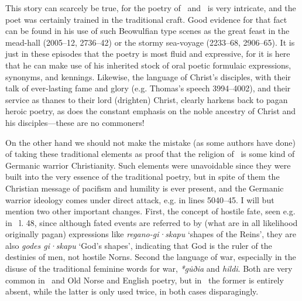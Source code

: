 This story can scarcely be true, for the poetry of \Heliand\ and \SaxonGenesis\ is very intricate, and the poet was certainly trained in the traditional craft.  Good evidence for that fact can be found in his use of such Beowulfian type scenes as the great feast in the mead-hall (2005–12, 2736–42) or the stormy sea-voyage (2233–68, 2906–65).  It is just in these episodes that the poetry is most fluid and expressive, for it is here that he can make use of his inherited stock of oral poetic formulaic expressions, synonyms, and kennings.  Likewise, the language of Christ’s disciples, with their talk of ever-lasting fame and glory (e.g. Thomas’s speech 3994–4002), and their service as thanes to their lord (drighten) Christ, clearly harkens back to pagan heroic poetry, as does the constant emphasis on the noble ancestry of Christ and his disciples—these are no commoners!

On the other hand we should not make the mistake (as some authors have done) of taking these traditional elements as proof that the religion of \Heliand\ is some kind of Germanic warrior Christianity.  Such elements were unavoidable since they were built into the very essence of the traditional poetry, but in spite of them the Christian message of pacifism and humility is ever present, and the Germanic warrior ideology comes under direct attack, e.g. in lines 5040–45.  I will but mention two other important changes.  First, the concept of hostile fate, seen e.g. in \Hildebrandslied\ l. 48, since although fated events are referred to by (what are in all likelihood originally pagan) expressions like \emph{regano-gi·skapu} ‘shapes of the Reins’, they are also \emph{godes gi·skapu} ‘God’s shapes’, indicating that God is the ruler of the destinies of men, not hostile Norns.  Second the language of war, especially in the disuse of the traditional feminine words for war, \emph{*gu̇ðia} and \emph{hildi}.  Both are very common in \Hildebrandslied\ and Old Norse and English poetry, but in \Heliand\ the former is entirely absent, while the latter is only used twice, in both cases disparagingly.

\sectionline

